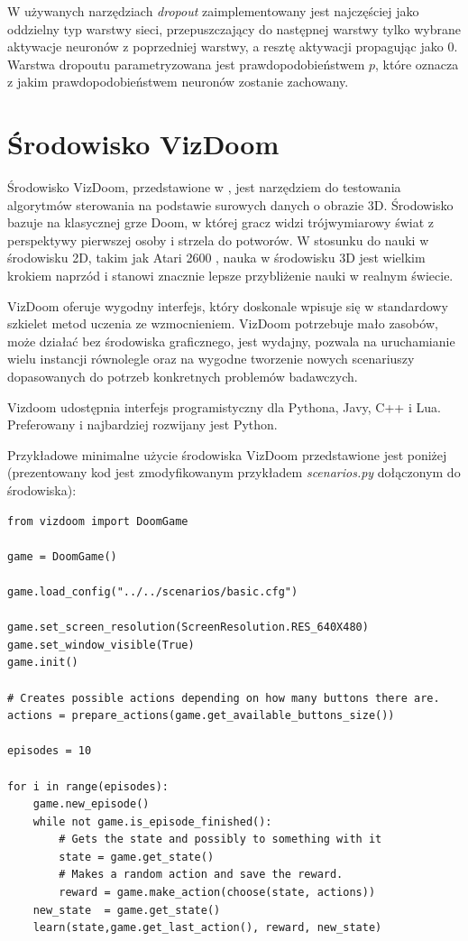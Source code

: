 \documentclass[polish,master,a4paper,oneside]{ppfcmthesis}
\begin{document}
W używanych narzędziach \textit{dropout} zaimplementowany jest najczęściej jako oddzielny typ warstwy sieci, przepuszczający do następnej warstwy tylko wybrane aktywacje neuronów z poprzedniej warstwy, a resztę aktywacji propagując jako 0. Warstwa dropoutu parametryzowana jest prawdopodobieństwem $p$, które oznacza z jakim prawdopodobieństwem neuronów zostanie zachowany.
 \section{Środowisko VizDoom}

Środowisko VizDoom, przedstawione w \cite{DBLP:journals/corr/KempkaWRTJ16}, jest narzędziem do testowania algorytmów sterowania na podstawie surowych danych o obrazie 3D. Środowisko bazuje na klasycznej grze Doom, w której gracz widzi trójwymiarowy świat z perspektywy pierwszej osoby i strzela do potworów. W stosunku do nauki w środowisku 2D, takim jak Atari 2600 \cite{mnih2015human}, nauka w środowisku  3D jest wielkim krokiem naprzód i stanowi znacznie lepsze przybliżenie nauki w realnym świecie.

VizDoom oferuje wygodny interfejs, który doskonale wpisuje się w standardowy szkielet metod uczenia ze wzmocnieniem. VizDoom potrzebuje mało zasobów, może działać bez środowiska graficznego, jest wydajny, pozwala na uruchamianie wielu instancji równolegle oraz na wygodne tworzenie nowych scenariuszy dopasowanych do potrzeb konkretnych problemów badawczych.

Vizdoom udostępnia interfejs programistyczny dla Pythona, Javy, C++ i Lua. Preferowany i najbardziej rozwijany jest Python.

Przykładowe minimalne użycie środowiska VizDoom przedstawione jest poniżej (prezentowany kod jest zmodyfikowanym przykładem \textit{scenarios.py} dołączonym do środowiska):

\begin{lstlisting}[language=iPython]
from vizdoom import DoomGame

game = DoomGame()

game.load_config("../../scenarios/basic.cfg")

game.set_screen_resolution(ScreenResolution.RES_640X480)
game.set_window_visible(True)
game.init()

# Creates possible actions depending on how many buttons there are.
actions = prepare_actions(game.get_available_buttons_size())

episodes = 10

for i in range(episodes):
    game.new_episode()
    while not game.is_episode_finished():
        # Gets the state and possibly to something with it
        state = game.get_state()
        # Makes a random action and save the reward.
        reward = game.make_action(choose(state, actions))
	new_state  = game.get_state() 
	learn(state,game.get_last_action(), reward, new_state)
\end{lstlisting}
\end{document}
